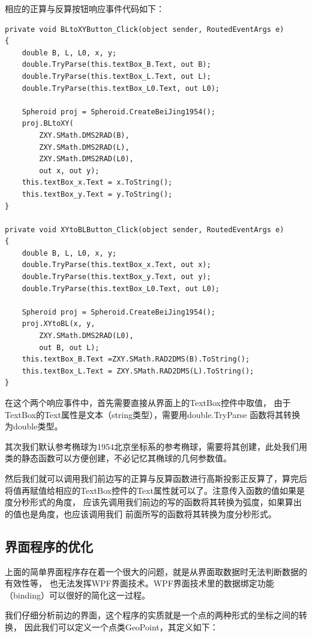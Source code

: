 相应的正算与反算按钮响应事件代码如下：

\begin{lstlisting}
private void BLtoXYButton_Click(object sender, RoutedEventArgs e)
{
    double B, L, L0, x, y;
    double.TryParse(this.textBox_B.Text, out B);
    double.TryParse(this.textBox_L.Text, out L);
    double.TryParse(this.textBox_L0.Text, out L0);

    Spheroid proj = Spheroid.CreateBeiJing1954();
    proj.BLtoXY(
        ZXY.SMath.DMS2RAD(B),
        ZXY.SMath.DMS2RAD(L),
        ZXY.SMath.DMS2RAD(L0),
        out x, out y);
    this.textBox_x.Text = x.ToString();
    this.textBox_y.Text = y.ToString();
}

private void XYtoBLButton_Click(object sender, RoutedEventArgs e)
{
    double B, L, L0, x, y;
    double.TryParse(this.textBox_x.Text, out x);
    double.TryParse(this.textBox_y.Text, out y);
    double.TryParse(this.textBox_L0.Text, out L0);

    Spheroid proj = Spheroid.CreateBeiJing1954();
    proj.XYtoBL(x, y,
        ZXY.SMath.DMS2RAD(L0),
        out B, out L);
    this.textBox_B.Text =ZXY.SMath.RAD2DMS(B).ToString();
    this.textBox_L.Text = ZXY.SMath.RAD2DMS(L).ToString();
}
\end{lstlisting}

在这个两个响应事件中，首先需要直接从界面上的TextBox控件中取值，
由于TextBox的Text属性是文本（string类型），需要用double.TryParse
函数将其转换为double类型。

其次我们默认参考椭球为1954北京坐标系的参考椭球，需要将其创建，此处我们用
类的静态函数可以方便创建，不必记忆其椭球的几何参数值。

然后我们就可以调用我们前边写的正算与反算函数进行高斯投影正反算了，算完后
将值再赋值给相应的TextBox控件的Text属性就可以了。注意传入函数的值如果是度分秒形式的角度，
应该先调用我们前边的写的函数将其转换为弧度，如果算出的值也是角度，也应该调用我们
前面所写的函数将其转换为度分秒形式。


\subsection{界面程序的优化}
上面的简单界面程序存在着一个很大的问题，就是从界面取数据时无法判断数据的有效性等，
也无法发挥WPF界面技术。WPF界面技术里的数据绑定功能（binding）可以很好的简化这一过程。

我们仔细分析前边的界面，这个程序的实质就是一个点的两种形式的坐标之间的转换，
因此我们可以定义一个点类GeoPoint，其定义如下：

